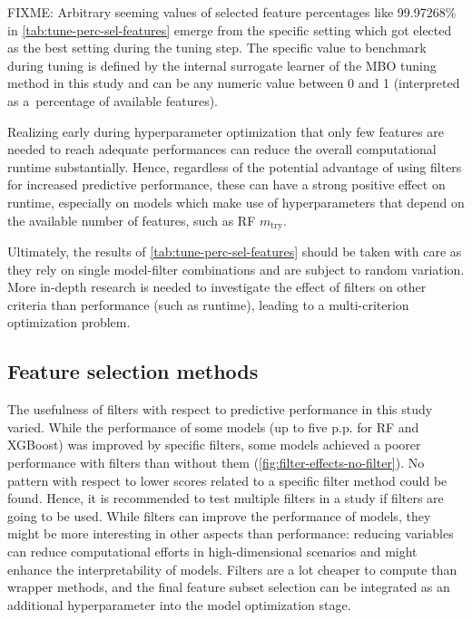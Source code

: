 \documentclass[remotesensing,article,submit,moreauthors,pdftex]{Definitions/mdpi}
\begin{document}
FIXME:
Arbitrary seeming values of selected feature percentages like 99.97268\% in \autoref{tab:tune-perc-sel-features} emerge from the specific setting which got elected as the best setting during the tuning step.
The specific value to benchmark during tuning is defined by the internal surrogate learner of the MBO tuning method in this study and can be any numeric value between 0 and 1 (interpreted as a\ percentage of available features).

Realizing early during hyperparameter optimization that only few features are needed to reach adequate performances can reduce the overall computational runtime substantially.
Hence, regardless of the potential advantage of using filters for increased predictive performance, these can have a strong positive effect on runtime, especially on models which make use of hyperparameters that depend on the available number of features, such as RF $m_\textrm{try}$.

Ultimately, the results of \autoref{tab:tune-perc-sel-features} should be taken with care as they rely on single model-filter combinations and are subject to random variation.
More in-depth research is needed to investigate the effect of filters on other criteria than performance (such as runtime), leading to a multi-criterion optimization problem.

\subsection{Feature selection methods}

The usefulness of filters with respect to predictive performance in this study varied.
While the performance of some models (up to five p.p. for RF and XGBoost) was improved by specific filters, some models achieved a poorer performance with filters than without them (\autoref{fig:filter-effects-no-filter}).
No pattern with respect to lower scores related to a specific filter method could be found.
Hence, it is recommended to test multiple filters in a study if filters are going to be used.
While filters can improve the performance of models, they might be more interesting in other aspects than performance: reducing variables can reduce computational efforts in high-dimensional scenarios and might enhance the interpretability of models.
Filters are a lot cheaper to compute than wrapper methods, and the final feature subset selection can be integrated as an additional hyperparameter into the model optimization stage.
\end{document}
